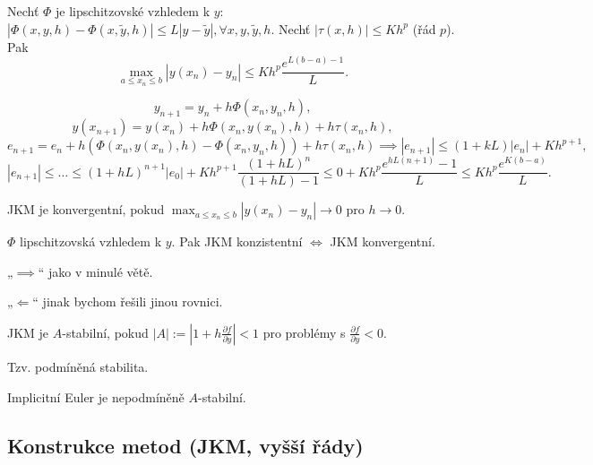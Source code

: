 \documentclass[12pt]{article}					%
\begin{document}
\begin{veta}
	Nechť $\Phi$ je lipschitzovské vzhledem k $y$: $|\Phi(x, y, h) - \Phi(x, \tilde y, h)| ≤ L|y - \tilde y|, \forall x, y, \tilde y, h$. Nechť $|\tau(x, h)| ≤ Kh^p$ (řád $p$). Pak
	$$ \max_{a ≤ x_n ≤ b} |y(x_n) - y_n| ≤ K h^p \frac{e^{L(b - a) - 1}}{L}. $$

	\begin{dukazin}
		$$ y_{n+1} = y_n + h \Phi(x_n, y_n, h), $$
		$$ y(x_{n+1}) = y(x_n) + h \Phi(x_n, y(x_n), h) + h\tau(x_n, h), $$
		$$ e_{n+1} = e_n + h(\Phi(x_n, y(x_n), h) - \Phi(x_n, y_n, h)) + h \tau(x_n, h) \implies |e_{n+1}| ≤ (1 + kL) |e_n| + Kh^{p + 1}, $$
		$$ |e_{n+1}| ≤ … ≤ (1+hL)^{n+1} |e_0| + Kh^{p+1} \frac{(1 + hL)^n}{(1 + hL) - 1} ≤ 0 + Kh^p \frac{e^{hL(n+1)} - 1}{L} ≤ Kh^p \frac{e^{K(b - a)}}{L}. $$
	\end{dukazin}
\end{veta}

\begin{definice}
	JKM je konvergentní, pokud $\max_{a ≤ x_n ≤ b} |y(x_n) - y_n| \rightarrow 0$ pro $h \rightarrow 0$.
\end{definice}

\begin{veta}
	$\Phi$ lipschitzovská vzhledem k $y$. Pak JKM konzistentní $\Leftrightarrow$ JKM konvergentní.

	\begin{dukazin}
		„$\implies$“ jako v minulé větě.

		„$\Leftarrow$“ jinak bychom řešili jinou rovnici.
	\end{dukazin}
\end{veta}

\begin{definice}
	JKM je $A$-stabilní, pokud $|A| := |1 + h\frac{\partial f}{\partial y}| < 1$ pro problémy s $\frac{\partial f}{\partial y} < 0$.

	Tzv. podmíněná stabilita.

	\begin{prikladyin}
		Implicitní Euler je nepodmíněně $A$-stabilní.
	\end{prikladyin}
\end{definice}

	\subsection{Konstrukce metod (JKM, vyšší řády)}
\end{document}
